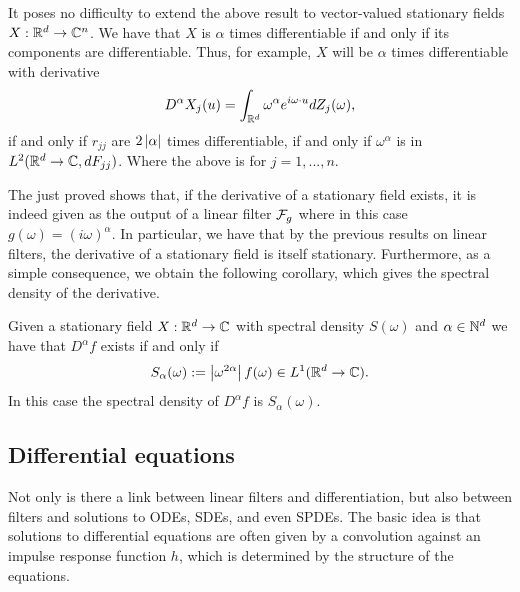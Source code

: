 \documentclass[
    a4paper,
    DIV=14,
    abstract=true,
    numbers=noenddot
]{scrartcl}
\begin{document}
\begin{observation}
	It poses no difficulty to extend the above result to vector-valued stationary fields $X:\mathbb{R}^d\to\mathbb{C}^n$.
	We have that $X$ is $\alpha$ times differentiable
	if and only if its components are differentiable. Thus, for example, $X$ will be $\alpha$ times differentiable with derivative
	\begin{equation*}
		D^\alpha X_j(u)=\int_{\mathbb{R}^d}\omega^{\alpha}e^{i\omega\cdot u}dZ_j(\omega),
	\end{equation*}
	if and only if $r_{jj}$ are $2\left| \alpha \right|$ times differentiable, if and only if $\omega^\alpha$ is in\\ $L^2(\mathbb{R}^d\to\mathbb{C}, dF_{jj})$. Where the above is for $j=1,...,n$.
\end{observation}
The just proved  shows that, if the derivative of a stationary field exists, it is indeed given as the output of a linear filter $\mathcal{F}_g$ where in this case $g(\omega)=(i\omega)^\alpha$. In particular, we have that by the previous results on linear filters, the derivative of a stationary field is itself stationary. Furthermore, as a simple consequence, we obtain the following corollary,
which gives the spectral density of the derivative.
\begin{corollary}\label{density of derivative}
	Given a stationary field $X:\mathbb{R}^d\to\mathbb{C}$ with spectral density $S(\omega)$
	and $\alpha\in \mathbb{N}^d$ we have that $D^\alpha f$ exists if and only if $$S_\alpha(\omega):=\left| \omega^{2\alpha} \right| f(\omega)\in L^1(\mathbb{R}^d\to\mathbb{C}).$$ In this case the spectral density of $D^\alpha f$ is $S_\alpha(\omega)$.
\end{corollary}
\subsection{Differential equations}\label{differential equations section}
Not only is there a link between linear filters and differentiation, but also between filters and solutions to ODEs, SDEs, and even SPDEs. The basic idea is that solutions to differential equations are often given by a convolution against an impulse response function $h$, which is determined by the structure of the equations.
\end{document}
